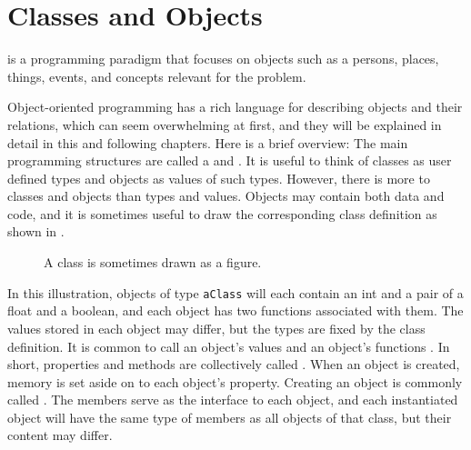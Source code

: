\documentclass[fsharpNotes.tex]{subfiles}
\begin{document}
\chapter{Classes and Objects}
\label{chap:oop}

 is a programming paradigm that focuses on objects such as a persons, places, things, events, and concepts relevant for the problem.

Object-oriented programming has a rich language for describing objects and their relations, which can seem overwhelming at first, and they will be explained in detail in this and following chapters. Here is a brief overview: The main programming structures are called a  and . It is useful to think of classes as user defined types and objects as values of such types. However, there is more to classes and objects than types and values. Objects may contain both data and code, and it is sometimes useful to draw the corresponding class definition as shown in .
\begin{figure}
  \centering
  \caption{A class is sometimes drawn as a figure.}
  \label{fig:aClass}
\end{figure}
In this illustration, objects of type \lstinline{aClass} will each contain an int and a pair of a float and a boolean, and each object has two functions associated with them. The values stored in each object may differ, but the types are fixed by the class definition. It is common to call an object's values  and an object's functions . In short, properties and methods are collectively called . When an object is created, memory is set aside on  to each object's property. Creating an object is commonly called . The members serve as the interface to each object, and each instantiated object will have the same type of members as all objects of that class, but their content may differ.
\end{document}
